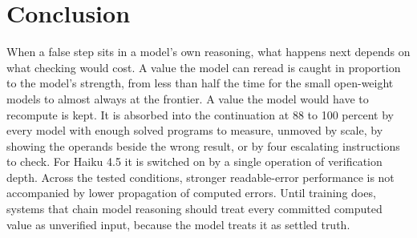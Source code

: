 \section{Conclusion}
\label{sec:conclusion}

When a false step sits in a model's own reasoning, what happens next depends on what checking would cost. A value the model can reread is caught in proportion to the model's strength, from less than half the time for the small open-weight models to almost always at the frontier. A value the model would have to recompute is kept. It is absorbed into the continuation at 88 to 100 percent by every model with enough solved programs to measure, unmoved by scale, by showing the operands beside the wrong result, or by four escalating instructions to check. For Haiku 4.5 it is switched on by a single operation of verification depth. Across the tested conditions, stronger readable-error performance is not accompanied by lower propagation of computed errors. Until training does, systems that chain model reasoning should treat every committed computed value as unverified input, because the model treats it as settled truth.
